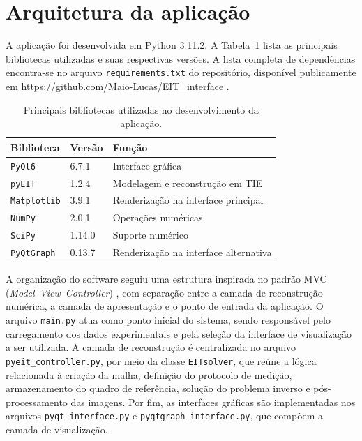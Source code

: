 \section{Arquitetura da aplicação}
\label{sec:arquitetura_aplicacao}

A aplicação foi desenvolvida em Python 3.11.2. A Tabela~\ref{tab:dependencias} lista as principais bibliotecas utilizadas e suas respectivas versões. A lista completa de dependências encontra-se no arquivo \texttt{requirements.txt} do repositório, disponível publicamente em \url{https://github.com/Maio-Lucas/EIT_interface} \cite{EITinterfaceGitHub}.

\begin{table}[H]
\centering
\caption{Principais bibliotecas utilizadas no desenvolvimento da aplicação.}
\label{tab:dependencias}
\begin{tabular}{lll}
\toprule
\textbf{Biblioteca} & \textbf{Versão} & \textbf{Função} \\
\midrule
\texttt{PyQt6}      & 6.7.1  & Interface gráfica \\
\texttt{pyEIT}      & 1.2.4  & Modelagem e reconstrução em TIE \\
\texttt{Matplotlib} & 3.9.1  & Renderização na interface principal \\
\texttt{NumPy}      & 2.0.1  & Operações numéricas \\
\texttt{SciPy}      & 1.14.0 & Suporte numérico \\
\texttt{PyQtGraph}  & 0.13.7 & Renderização na interface alternativa \\
\bottomrule
\end{tabular}
\end{table}

A organização do software seguiu uma estrutura inspirada no padrão MVC (\textit{Model--View--Controller}) \cite{Reenskaug1979}, com separação entre a camada de reconstrução numérica, a camada de apresentação e o ponto de entrada da aplicação. O arquivo \texttt{main.py} atua como ponto inicial do sistema, sendo responsável pelo carregamento dos dados experimentais e pela seleção da interface de visualização a ser utilizada. A camada de reconstrução é centralizada no arquivo \texttt{pyeit\_controller.py}, por meio da classe \texttt{EITsolver}, que reúne a lógica relacionada à criação da malha, definição do protocolo de medição, armazenamento do quadro de referência, solução do problema inverso e pós-processamento das imagens. Por fim, as interfaces gráficas são implementadas nos arquivos \texttt{pyqt\_interface.py} e \texttt{pyqtgraph\_interface.py}, que compõem a camada de visualização.


